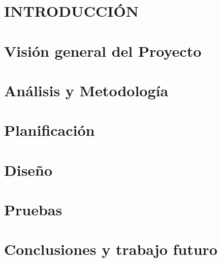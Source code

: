 \documentclass[b5paper,10pt,twoside]{book}
\begin{document}
	\listoffigures
	
	\listoftables
	
	\chapter{INTRODUCCIÓN}
	
	
	
	\chapter{Visión general del Proyecto}

	
	
	\chapter{Análisis y Metodología}
	
	
	
	\chapter{Planificación}
	
	
	
	\chapter{Diseño}
	
	
	
	\chapter{Pruebas}
	
	
	
	\chapter{Conclusiones y trabajo futuro}
	
	
	
		
	
\end{document}

